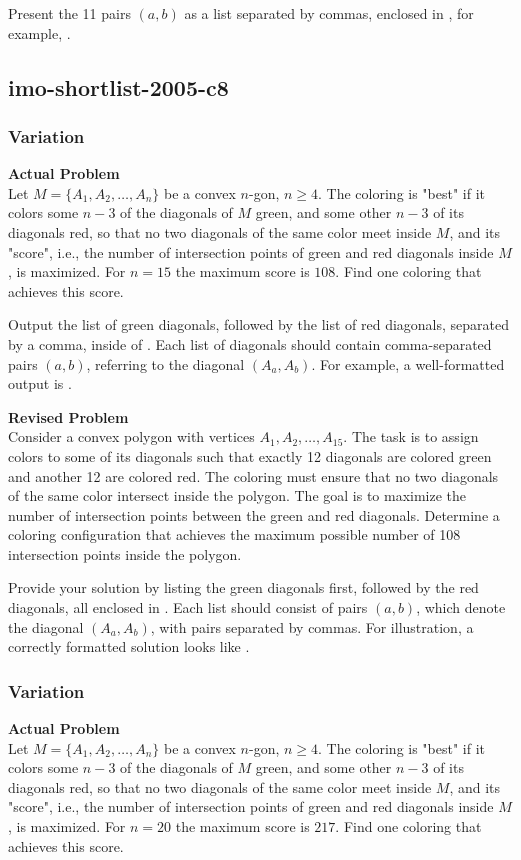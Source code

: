 Present the 11 pairs \((a, b)\) as a list separated by commas, enclosed in \boxed, for example, .

\subsection{imo-shortlist-2005-c8}
\subsubsection{Variation}
\textbf{Actual Problem}\\
Let $M=\{A_1, A_2, \ldots, A_n\}$ be a convex $n$-gon, $n \geq 4$. 
The coloring is "best" if it colors some $n-3$ of the diagonals of $M$ green, and some other $n-3$ of its diagonals red, so that no two diagonals of the same color meet inside $M$, and its "score", i.e., the number of intersection points of green and red diagonals inside $M$, is maximized.
For $n=15$ the maximum score is $108$.
Find one coloring that achieves this score. 


Output the list of green diagonals, followed by the list of red diagonals, separated by a comma, inside of \boxed. Each list of diagonals should contain comma-separated pairs $(a,b)$, referring to the diagonal $(A_a, A_b)$. For example, a well-formatted output is .

\textbf{Revised Problem}\\
Consider a convex polygon with vertices $A_1, A_2, \ldots, A_{15}$. The task is to assign colors to some of its diagonals such that exactly 12 diagonals are colored green and another 12 are colored red. The coloring must ensure that no two diagonals of the same color intersect inside the polygon. The goal is to maximize the number of intersection points between the green and red diagonals. Determine a coloring configuration that achieves the maximum possible number of 108 intersection points inside the polygon.

Provide your solution by listing the green diagonals first, followed by the red diagonals, all enclosed in \boxed. Each list should consist of pairs $(a,b)$, which denote the diagonal $(A_a, A_b)$, with pairs separated by commas. For illustration, a correctly formatted solution looks like .

\subsubsection{Variation}
\textbf{Actual Problem}\\
Let $M=\{A_1, A_2, \ldots, A_n\}$ be a convex $n$-gon, $n \geq 4$. 
The coloring is "best" if it colors some $n-3$ of the diagonals of $M$ green, and some other $n-3$ of its diagonals red, so that no two diagonals of the same color meet inside $M$, and its "score", i.e., the number of intersection points of green and red diagonals inside $M$, is maximized.
For $n=20$ the maximum score is $217$.
Find one coloring that achieves this score. 


